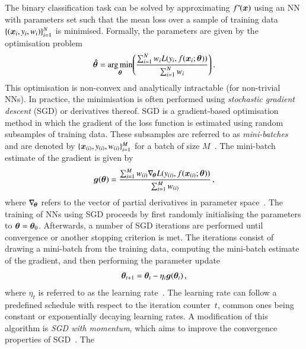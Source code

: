 The binary classification task can be solved by approximating
$f^{*\!}(\bm{x})$ using an NN with parameters set such that the mean loss
over a sample of training data~$\{ (\bm{x}_i, y_i, w_i) \}_{i = 1}^N$ is
minimised. Formally, the parameters are given by the optimisation problem
\begin{align*}
  \bm{\hat{\theta}} =
  \operatorname*{arg\,min}_{\bm{\theta}}\mathopen{}\left(
  \frac{\sum_{i = 1}^{N} w_i L(y_i, f(\bm{x}_i; \bm{\theta}))}{\sum_{i = 1}^{N} w_i}
  \right)\mathclose{}
  \,\text{.}
\end{align*}
This optimisation is non-convex and analytically intractable (for non-trivial
NNs). In practice, the minimisation is often performed using \emph{stochastic
  gradient descent} (SGD) or derivatives thereof. SGD is a gradient-based
optimisation method in which the gradient of the loss function is estimated
using random subsamples of training data. These subsamples are referred to as
\emph{mini-batches} and are denoted by
$\{\bm{x}_{(i)}, y_{(i)}, w_{(i)}\}_{i=1}^{M}$ for a batch of size
$M$~\cite{Goodfellow-et-al-2016}. The mini-batch estimate of the gradient is
given by
\begin{align*}
  \bm{g}(\bm{\theta})
  = \frac{
  \sum_{i=1}^{M} w_{(i)}  \nabla_{\!\bm{\theta}} L(y_{(i)}, f(\bm{x}_{(i)}; \bm{\theta}))
  }{
  \sum_{i=1}^{M} w_{(i)}
  } \,\text{,}
\end{align*}
where $\nabla_{\!\bm{\theta}}$ refers to the vector of partial derivatives in
parameter space~\cite{Goodfellow-et-al-2016}. The training of NNs using SGD
proceeds by first randomly initialising the parameters to
$\bm{\theta} = \bm{\theta}_0$. Afterwards, a number of SGD iterations are
performed until convergence or another stopping criterion is met. The iterations
consist of drawing a mini-batch from the training data, computing the mini-batch
estimate of the gradient, and then performing the parameter update
\begin{align*}
  \bm{\theta}_{t + 1} = \bm{\theta}_{t} - \eta_{t} \bm{g}(\bm{\theta}_{t}) \,\text{,}
\end{align*}
where $\eta_{t}$ is referred to as the learning
rate~\cite{Goodfellow-et-al-2016}. The learning rate can follow a predefined
schedule with respect to the iteration counter~$t$, common ones being constant
or exponentially decaying learning rates. A modification of this algorithm is
\emph{SGD with momentum}, which aims to improve the convergence properties of
SGD~\cite{polyak1964some,rumelhart1986learning,sutskever2013importance}. The
